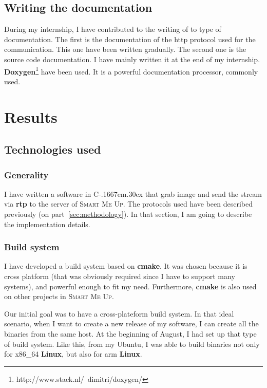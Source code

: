 \documentclass[a4paper,11pt]{custom}
\newcommand{\smu}{\textsc{Smart Me Up}}
\newcommand{\rtp}{\textbf{rtp}\xspace}
\newcommand{\cmake}{\textbf{cmake}\xspace}
\newcommand{\linux}{\textbf{Linux}\xspace}
\newcommand{\cpp}{%
  C\kern-.1667em\raise.30ex\hbox{\smaller{++}\xspace}%
  \spacefactor1000%
}
\begin{document}
\section{Writing the documentation}

During my internship, I have contributed to the writing of to type of
documentation. The first is the documentation of the http protocol used for the
communication. This one have been written gradually. The second one is the source
code documentation. I have mainly written it at the end of my internship.
\textbf{Doxygen}\footnote{http://www.stack.nl/~dimitri/doxygen/} have been used.
It is a powerful documentation processor, commonly used.

\chapter{Results}

\section{Technologies used}

\subsection{Generality}

I have written a software in \cpp that grab image and send the stream via \rtp to
the server of \smu. The protocols used have been described previously (on
part~\ref{sec:methodology}). In that section, I am going to describe the
implementation details.

\subsection{Build system}

I have developed a build system based on \cmake. It was chosen because it is
cross platform (that was obviously required since I have to support many
systems), and powerful enough to fit my need. Furthermore, \cmake is also used on
other projects in \smu.

Our initial goal was to have a cross-plateform build system. In that ideal
scenario, when I want to create a new release of my software, I can create all
the binaries from the same host. At the beginning of August, I had set up that
type of build system. Like this, from my Ubuntu, I was able to build binaries
not only for x86\_64 \linux, but also for arm \linux.
\end{document}

